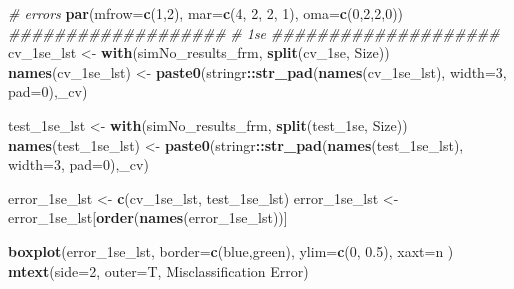 \documentclass[
]{book}
\newenvironment{Shaded}{\begin{snugshade}}{\end{snugshade}}
\newcommand{\CommentTok}[1]{\textcolor[rgb]{0.56,0.35,0.01}{\textit{#1}}}
\newcommand{\DataTypeTok}[1]{\textcolor[rgb]{0.13,0.29,0.53}{#1}}
\newcommand{\DecValTok}[1]{\textcolor[rgb]{0.00,0.00,0.81}{#1}}
\newcommand{\FloatTok}[1]{\textcolor[rgb]{0.00,0.00,0.81}{#1}}
\newcommand{\KeywordTok}[1]{\textcolor[rgb]{0.13,0.29,0.53}{\textbf{#1}}}
\newcommand{\NormalTok}[1]{#1}
\newcommand{\OperatorTok}[1]{\textcolor[rgb]{0.81,0.36,0.00}{\textbf{#1}}}
\newcommand{\StringTok}[1]{\textcolor[rgb]{0.31,0.60,0.02}{#1}}
\begin{document}
\begin{Shaded}
\begin{Highlighting}[]
\CommentTok{\# errors}
\KeywordTok{par}\NormalTok{(}\DataTypeTok{mfrow=}\KeywordTok{c}\NormalTok{(}\DecValTok{1}\NormalTok{,}\DecValTok{2}\NormalTok{), }\DataTypeTok{mar=}\KeywordTok{c}\NormalTok{(}\DecValTok{4}\NormalTok{, }\DecValTok{2}\NormalTok{, }\DecValTok{2}\NormalTok{, }\DecValTok{1}\NormalTok{), }\DataTypeTok{oma=}\KeywordTok{c}\NormalTok{(}\DecValTok{0}\NormalTok{,}\DecValTok{2}\NormalTok{,}\DecValTok{2}\NormalTok{,}\DecValTok{0}\NormalTok{))}
\CommentTok{\#\#\#\#\#\#\#\#\#\#\#\#\#\#\#\#\#\#\#}
\CommentTok{\# 1se}
\CommentTok{\#\#\#\#\#\#\#\#\#\#\#\#\#\#\#\#\#\#\#\#}
\NormalTok{cv\_1se\_lst <{-}}\StringTok{ }\KeywordTok{with}\NormalTok{(simNo\_results\_frm,}
 \KeywordTok{split}\NormalTok{(cv\_1se, Size))}
\KeywordTok{names}\NormalTok{(cv\_1se\_lst) <{-}}\StringTok{ }\KeywordTok{paste0}\NormalTok{(stringr}\OperatorTok{::}\KeywordTok{str\_pad}\NormalTok{(}\KeywordTok{names}\NormalTok{(cv\_1se\_lst), }\DataTypeTok{width=}\DecValTok{3}\NormalTok{, }\DataTypeTok{pad=}\StringTok{\textquotesingle{}0\textquotesingle{}}\NormalTok{),}\StringTok{\textquotesingle{}\_cv\textquotesingle{}}\NormalTok{)}

\NormalTok{test\_1se\_lst <{-}}\StringTok{ }\KeywordTok{with}\NormalTok{(simNo\_results\_frm,}
 \KeywordTok{split}\NormalTok{(test\_1se, Size))}
\KeywordTok{names}\NormalTok{(test\_1se\_lst) <{-}}\StringTok{ }\KeywordTok{paste0}\NormalTok{(stringr}\OperatorTok{::}\KeywordTok{str\_pad}\NormalTok{(}\KeywordTok{names}\NormalTok{(test\_1se\_lst), }\DataTypeTok{width=}\DecValTok{3}\NormalTok{, }\DataTypeTok{pad=}\StringTok{\textquotesingle{}0\textquotesingle{}}\NormalTok{),}\StringTok{\textquotesingle{}\_cv\textquotesingle{}}\NormalTok{)}

\NormalTok{error\_1se\_lst <{-}}\StringTok{ }\KeywordTok{c}\NormalTok{(cv\_1se\_lst, test\_1se\_lst)}
\NormalTok{error\_1se\_lst <{-}}\StringTok{ }\NormalTok{error\_1se\_lst[}\KeywordTok{order}\NormalTok{(}\KeywordTok{names}\NormalTok{(error\_1se\_lst))]}

\KeywordTok{boxplot}\NormalTok{(error\_1se\_lst, }
  \DataTypeTok{border=}\KeywordTok{c}\NormalTok{(}\StringTok{\textquotesingle{}blue\textquotesingle{}}\NormalTok{,}\StringTok{\textquotesingle{}green\textquotesingle{}}\NormalTok{), }
  \DataTypeTok{ylim=}\KeywordTok{c}\NormalTok{(}\DecValTok{0}\NormalTok{, }\FloatTok{0.5}\NormalTok{), }
  \DataTypeTok{xaxt=}\StringTok{\textquotesingle{}n\textquotesingle{}}
\NormalTok{)}
\KeywordTok{mtext}\NormalTok{(}\DataTypeTok{side=}\DecValTok{2}\NormalTok{, }\DataTypeTok{outer=}\NormalTok{T,  }\StringTok{\textquotesingle{}Misclassification Error\textquotesingle{}}\NormalTok{)}


\end{Highlighting}
\end{Shaded}
\end{document}
